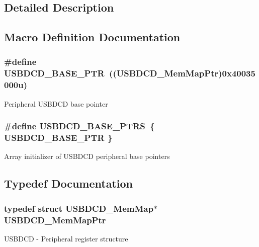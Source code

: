 \subsection{Detailed Description}


\subsection{Macro Definition Documentation}
\hypertarget{group___u_s_b_d_c_d___peripheral_ga6289dc687e9b991508629237aeb61755}{}
\subsubsection[{U\+S\+B\+D\+C\+D\+\_\+\+B\+A\+S\+E\+\_\+\+P\+T\+R}]{\setlength{\rightskip}{0pt plus 5cm}\#define U\+S\+B\+D\+C\+D\+\_\+\+B\+A\+S\+E\+\_\+\+P\+T\+R~(({\bf U\+S\+B\+D\+C\+D\+\_\+\+Mem\+Map\+Ptr})0x40035000u)}\label{group___u_s_b_d_c_d___peripheral_ga6289dc687e9b991508629237aeb61755}
Peripheral U\+S\+B\+D\+C\+D base pointer \hypertarget{group___u_s_b_d_c_d___peripheral_ga343ff2427307e24846cef614df7cea8a}{}
\subsubsection[{U\+S\+B\+D\+C\+D\+\_\+\+B\+A\+S\+E\+\_\+\+P\+T\+R\+S}]{\setlength{\rightskip}{0pt plus 5cm}\#define U\+S\+B\+D\+C\+D\+\_\+\+B\+A\+S\+E\+\_\+\+P\+T\+R\+S~\{ {\bf U\+S\+B\+D\+C\+D\+\_\+\+B\+A\+S\+E\+\_\+\+P\+T\+R} \}}\label{group___u_s_b_d_c_d___peripheral_ga343ff2427307e24846cef614df7cea8a}
Array initializer of U\+S\+B\+D\+C\+D peripheral base pointers 

\subsection{Typedef Documentation}
\hypertarget{group___u_s_b_d_c_d___peripheral_gad6e68bd3ca7f14168c34ff5e824dd321}{}
\subsubsection[{U\+S\+B\+D\+C\+D\+\_\+\+Mem\+Map\+Ptr}]{\setlength{\rightskip}{0pt plus 5cm}typedef struct {\bf U\+S\+B\+D\+C\+D\+\_\+\+Mem\+Map}$\ast$ {\bf U\+S\+B\+D\+C\+D\+\_\+\+Mem\+Map\+Ptr}}\label{group___u_s_b_d_c_d___peripheral_gad6e68bd3ca7f14168c34ff5e824dd321}
U\+S\+B\+D\+C\+D -\/ Peripheral register structure 